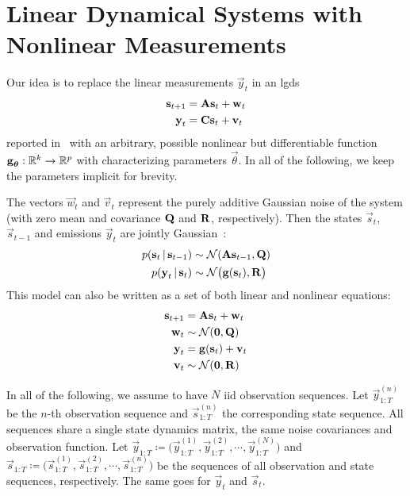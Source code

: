 \section{Linear Dynamical Systems with Nonlinear Measurements}



Our idea is to replace the linear measurements \( \vec{y}_t \) in an \ac{lgds}
\begin{align*}
	\boldsymbol{\mathrm{s}}_{t + 1} & = \boldsymbol{\mathrm{A}} \boldsymbol{\mathrm{s}}_t + \boldsymbol{\mathrm{w}}_t \\
	\boldsymbol{\mathrm{y}}_t       & = \boldsymbol{\mathrm{C}} \boldsymbol{\mathrm{s}}_t + \boldsymbol{\mathrm{v}}_t
\end{align*}
reported in~\cite{ghahramaniParameterEstimationLinear1996} with an arbitrary, possible nonlinear but differentiable function \( \boldsymbol{\mathrm{g}}_{\boldsymbol{\mathrm{\theta}}} : \mathbb{R}^k \to \mathbb{R}^p \) with characterizing parameters \( \vec{\theta} \). In all of the following, we keep the parameters implicit for brevity.

The vectors \( \vec{w}_t \) and \( \vec{v}_t \) represent the purely additive Gaussian noise of the system (with zero mean and covariance \( \boldsymbol{\mathrm{Q}} \) and \( \boldsymbol{\mathrm{R}} \), respectively). Then the states \( \vec{s}_t \), \( \vec{s}_{t - 1} \) and emissions \( \vec{y}_t \) are jointly Gaussian~\cite{minkaHiddenMarkovModels1999}:
\begin{align*}
	p(\boldsymbol{\mathrm{s}}_t \,\vert\, \boldsymbol{\mathrm{s}}_{t - 1}) & \sim \mathcal{N}(\boldsymbol{\mathrm{A}} \boldsymbol{\mathrm{s}}_{t - 1}, \boldsymbol{\mathrm{Q}})    \\
	p(\boldsymbol{\mathrm{y}}_t \,\vert\, \boldsymbol{\mathrm{s}}_t)       & \sim \mathcal{N}\big(\boldsymbol{\mathrm{g}}(\boldsymbol{\mathrm{s}}_t), \boldsymbol{\mathrm{R}}\big)
\end{align*}
This model can also be written as a set of both linear and nonlinear equations:
\begin{align*}
	\boldsymbol{\mathrm{s}}_{t + 1} & = \boldsymbol{\mathrm{A}} \boldsymbol{\mathrm{s}}_t + \boldsymbol{\mathrm{w}}_t  \\
	\boldsymbol{\mathrm{w}}_t       & \sim \mathcal{N}(\boldsymbol{\mathrm{0}}, \boldsymbol{\mathrm{Q}})   \\
	\boldsymbol{\mathrm{y}}_t       & = \boldsymbol{\mathrm{g}}(\boldsymbol{\mathrm{s}}_t) + \boldsymbol{\mathrm{v}}_t \\
	\boldsymbol{\mathrm{v}}_t       & \sim \mathcal{N}(\boldsymbol{\mathrm{0}}, \boldsymbol{\mathrm{R}})
\end{align*}

In all of the following, we assume to have \(N\) \ac{iid} observation sequences. Let \( \vec{y}_{1:T}^{(n)} \) be the \(n\)-th observation sequence and \( \vec{s}_{1:T}^{(n)} \) the corresponding state sequence. All sequences share a single state dynamics matrix, the same noise covariances and observation function. Let \( \vec{y}_{1:T} \coloneqq \big(\vec{y}_{1:T}^{(1)}, \vec{y}_{1:T}^{(2)}, \cdots, \vec{y}_{1:T}^{(N)}\big) \) and \( \vec{s}_{1:T} \coloneqq \big(\vec{s}_{1:T}^{(1)}, \vec{s}_{1:T}^{(2)}, \cdots, \vec{s}_{1:T}^{(n)}\big) \) be the sequences of all observation and state sequences, respectively. The same goes for \( \vec{y}_t \) and \( \vec{s}_t \).

